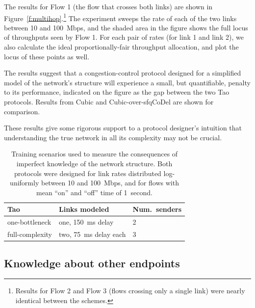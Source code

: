 The results for Flow 1 (the flow that crosses both links) are shown in
Figure~\ref{f:multihop}.\footnote{Results for Flow 2 and Flow 3
  (flows crossing only a single link) were nearly identical between
  the schemes.} The experiment sweeps the rate of each of the two
links between 10 and 100~Mbps, and the shaded area in the figure shows
the full locus of throughputs seen by Flow 1. For each pair of rates
(for link 1 and link 2), we also calculate the ideal
proportionally-fair throughput allocation, and plot the locus of these
points as well.

The results suggest that a congestion-control protocol designed for a
simplified model of the network's structure will experience a small,
but quantifiable, penalty to its performance, indicated on the figure
as the gap between the two Tao protocols. Results from Cubic and
Cubic-over-sfqCoDel are shown for comparison.

These results give some rigorous support to a protocol designer's
intuition that understanding the true network in all its complexity
may not be crucial.

\begin{table}
\centering
\begin{tabular}{l|l|l}
\bf Tao & \bf Links modeled & \bf Num.~senders \\
\hline
one-bottleneck & one, 150~ms delay & 2 \\
full-complexity & two, 75~ms delay each & 3 \\
\end{tabular}
\caption{Training scenarios used to measure the consequences of imperfect
  knowledge of the network structure. Both protocols were designed for
  link rates distributed log-uniformly between 10 and 100~Mbps, and
  for flows with mean ``on'' and ``off'' time of 1~second.
}
\label{table:topology-training}
\end{table}

\subsection{Knowledge about other endpoints}

